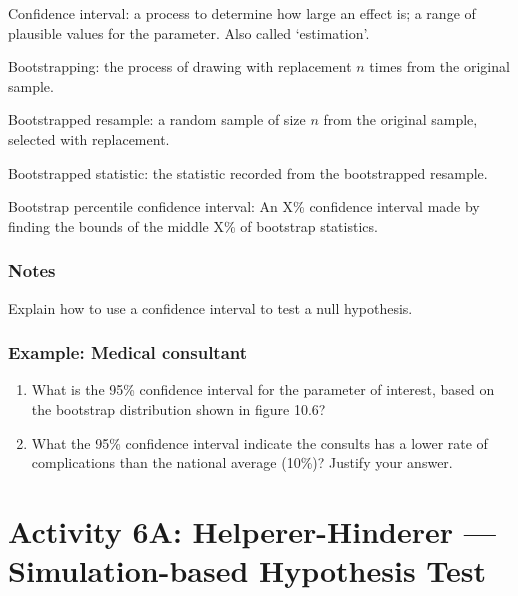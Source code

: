 \documentclass[
]{report}
\newcommand{\rgs}{\vspace{12pt}} %
\begin{document}
Confidence interval: a process to determine how large an effect is; a range of plausible values for the parameter. Also called `estimation'.

Bootstrapping: the process of drawing with replacement \(n\) times from the original sample.

Bootstrapped resample: a random sample of size \(n\) from the original sample, selected with replacement.

Bootstrapped statistic: the statistic recorded from the bootstrapped resample.

Bootstrap percentile confidence interval: An X\% confidence interval made by finding the bounds of the middle X\% of bootstrap statistics.

\hypertarget{notes-16}{%
\subsubsection*{Notes}\label{notes-16}}

Explain how to use a confidence interval to test a null hypothesis.
\rgs
\rgs

\hypertarget{example-medical-consultant-2}{%
\subsubsection*{Example: Medical consultant}\label{example-medical-consultant-2}}

\begin{enumerate}
\def\labelenumi{\arabic{enumi}.}
\item
  What is the 95\% confidence interval for the parameter of interest, based on the bootstrap distribution shown in figure 10.6?
  \rgs
\item
  What the 95\% confidence interval indicate the consults has a lower rate of complications than the national average (10\%)? Justify your answer.
  \rgs
\end{enumerate}

\newpage

\hypertarget{activity-6a-helperer-hinderer-simulation-based-hypothesis-test}{%
\section{Activity 6A: Helperer-Hinderer --- Simulation-based Hypothesis Test}\label{activity-6a-helperer-hinderer-simulation-based-hypothesis-test}}
\end{document}
